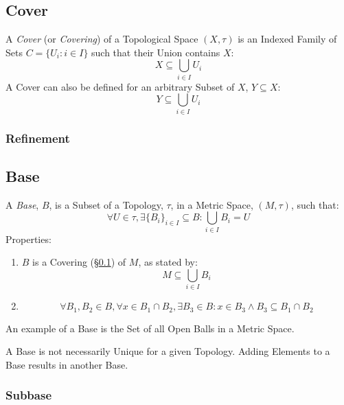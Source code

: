 \subsection{Cover}\label{sec:topological_cover}

A \emph{Cover} (or \emph{Covering}) of a Topological Space $(X, \tau)$
is an Indexed Family of Sets $C = \{ U_i : i \in I \}$ such that their
Union contains $X$:
\[
  X \subseteq \bigcup_{i \in I} U_i
\]
A Cover can also be defined for an arbitrary Subset of $X$, $Y
\subseteq X$:
\[
  Y \subseteq \bigcup_{i \in I} U_i
\]

\subsubsection{Refinement}\label{sec:refinement}



\subsection{Base}\label{sec:topological_base}

A \emph{Base}, $B$, is a Subset of a Topology, $\tau$, in a Metric
Space, $(M,\tau)$, such that:
\[
    \forall U \in \tau, \exists \{B_i\}_{i \in I} \subseteq B :
    \bigcup_{i \in I}B_i = U
\]
Properties:
\begin{enumerate}
    \item $B$ is a Covering (\S\ref{sec:topological_cover}) of $M$, as
      stated by:
\[
    M \subseteq \bigcup_{i \in I} B_i
\]

    \item
\[
    \forall B_1, B_2 \in B, \forall x \in B_1 \cap B_2,
    \exists B_3 \in B : x \in B_3 \wedge B_3 \subseteq B_1 \cap B_2
\]

\end{enumerate}
An example of a Base is the Set of all Open Balls in a Metric Space.

A Base is not necessarily Unique for a given Topology. Adding Elements
to a Base results in another Base.



\subsubsection{Subbase}\label{sec:subbase}

